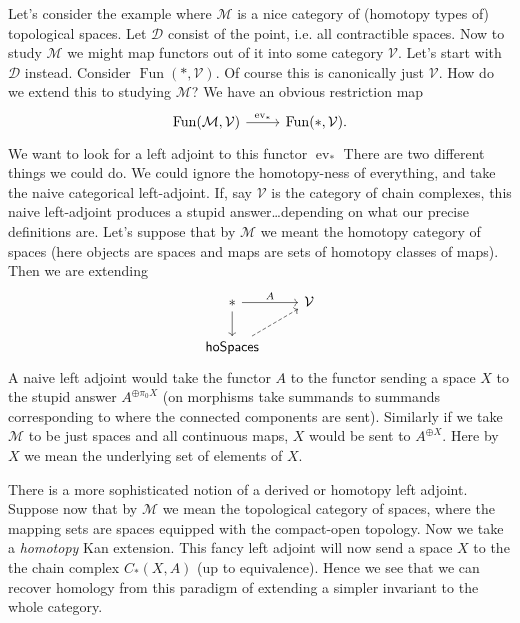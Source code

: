 \documentclass{amsart}
\DeclareMathOperator{\Fun}{Fun}
\DeclareMathOperator{\ev}{ev}
\begin{document}
Let's consider the example where $\mathcal{M}$ is a nice category of (homotopy types of)
topological spaces. Let $\mathcal{D}$ consist of the point, i.e. all contractible spaces.
Now to study $\mathcal{M}$ we might map functors out of it into some category $\mathcal{V}$.
Let's start with $\mathcal{D}$ instead. Consider $\Fun(*, \mathcal{V})$.
Of course this is canonically just $\mathcal{V}$. How do we extend this to studying $\mathcal{M}$?
We have an obvious restriction map
\begin{equation*}
    \begin{tikzcd}
        \Fun(\mathcal{M},\mathcal{V}) \rar{\ev_*} & \Fun(*, \mathcal{V}).
    \end{tikzcd}
\end{equation*}
We want to look for a left adjoint to this functor $\ev_*$
There are two different
things we could do. We could ignore the homotopy-ness of everything, and take the naive
categorical left-adjoint. If, say $\mathcal{V}$ is the category of chain complexes, this naive
left-adjoint produces a stupid answer\ldots depending on what our precise definitions are.
Let's suppose that by $\mathcal{M}$ we meant the homotopy category of spaces (here objects are spaces
and maps are sets of homotopy classes of maps).
Then we are extending
\begin{equation*}
    \begin{tikzcd}
        *\rar{A}\dar & \mathcal{V}\\
        \mathsf{hoSpaces}\urar[dashed]
    \end{tikzcd}
\end{equation*}
A naive left adjoint would take the functor $A$ to the functor sending a space $X$ to the
stupid answer $A^{\oplus \pi_0X}$ (on morphisms take summands to summands corresponding
to where the connected components are sent).
Similarly if we take $\mathcal{M}$ to be just spaces and all continuous maps, $X$ would
be sent to $A^{\oplus X}$. Here by $X$ we mean the underlying set of elements of $X$.

There is a more sophisticated notion of a derived or homotopy left adjoint.
Suppose now that by $\mathcal{M}$
we mean the topological category of spaces, where the mapping sets are spaces equipped
with the compact-open topology. Now we take a \textit{homotopy} Kan extension. This
fancy left adjoint will now send a space $X$ to the the chain complex $C_*(X, A)$
(up to equivalence). Hence we see that we can recover homology from this paradigm
of extending a simpler invariant to the whole category.
\end{document}
